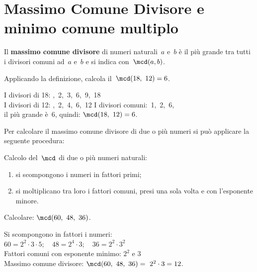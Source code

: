 
\section{Massimo Comune Divisore e minimo comune multiplo}
\label{sec:nat_mcdemcm}

\label{def:mcd}
\begin{definizione}{}{}
Il \textbf{massimo comune divisore} di numeri naturali~\(a\) e~\(b\)  è il
più grande tra tutti i divisori comuni ad~\(a\) e~\(b\)
e si indica con~\(\mcd(a,b)\).
\end{definizione}

\begin{esempio}{}{}
Applicando la definizione, calcola il~\(\mcd(18,~12) = 6\).

I divisori di 18: ,~2,~3,~6,~9,~18\\
I divisori di 12: ,~2,~4,~6,~12
I divisori comuni:~1,~2,~6, \\
il più grande è~6, quindi: \quad \(\mcd(18,~12) = 6\). 
\end{esempio}


Per calcolare il massimo comune divisore di due o più numeri si può 
applicare la seguente procedura:

\begin{procedura}{}{}
Calcolo del~\(\mcd\) di due o più numeri naturali:
\begin{enumerate}[noitemsep, label=(\alph*)]
 \item si scompongono i numeri in fattori primi;
 \item si moltiplicano tra loro i fattori comuni, 
  presi una sola volta e con l'esponente minore.
\end{enumerate}
\end{procedura}


\begin{esempio}{}{}
Calcolare: \quad \(\mcd(60,~48,~36)\).

Si scompongono in fattori i numeri: \\
\(60 = 2^2 \cdot 3 \cdot 5; 
  \quad 48 = 2^4 \cdot 3; 
  \quad 36 = 2^2 \cdot 3^2\)\\
Fattori comuni con esponente minimo: \quad \(2^2\) e \(3\) \\
Massimo comune divisore: \quad \(\mcd(60,~48,~36)=~2^2 \cdot 3 = 12\).
\end{esempio}

